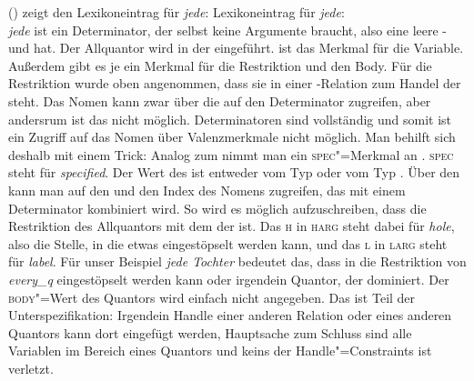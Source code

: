 () zeigt den Lexikoneintrag für \emph{jede}:
\eas
Lexikoneintrag für \emph{jede}:\\
\zs
\emph{jede} ist ein Determinator, der selbst keine Argumente braucht, also eine leere \spr- und
\compsl hat. Der Allquantor wird in der \relsl eingeführt. \argzero ist das Merkmal für die
Variable. Außerdem gibt es je ein Merkmal für die Restriktion und den Body. Für die Restriktion
wurde oben angenommen, dass sie in einer \qeq\vspace{-2pt}\hspace{-.5ex}\hyp Relation zum Handel der \nbar steht. Das Nomen kann
zwar über die \sprl auf den Determinator zugreifen, aber andersrum ist das nicht
möglich. Determinatoren sind vollständig und somit ist ein Zugriff auf das Nomen über Valenzmerkmale
nicht möglich. Man behilft sich deshalb mit einem Trick: Analog zum \modm nimmt man ein
\textsc{spec}"=Merkmal an \citep[--51]{ps2}. \textsc{spec} steht für \emph{specified}. Der Wert des \specms ist
entweder vom Typ  oder vom Typ . Über den \specw kann man auf den \ltopw und
den Index des Nomens zugreifen, das mit einem Determinator kombiniert wird. So wird es möglich
aufzuschreiben, dass die Restriktion des Allquantors \qeq\vspace{-2pt} mit dem \ltopw der \nbar
ist. Das \textsc{h} in \textsc{harg} steht dabei für \emph{hole}, also die Stelle, in die etwas
eingestöpselt werden kann, und das \textsc{l} in \textsc{larg} steht für \emph{label}. Für unser
Beispiel \emph{jede Tochter} bedeutet das, dass  in die Restriktion von
\emph{every\_q} eingestöpselt werden kann oder irgendein Quantor, der 
dominiert. Der \textsc{body}"=Wert des Quantors wird einfach nicht angegeben. Das ist Teil der
Unterspezifikation: Irgendein Handle einer anderen Relation oder eines anderen Quantors kann dort
eingefügt werden, Hauptsache zum Schluss sind alle Variablen im Bereich eines Quantors und keins der
Handle"=Constraints ist verletzt.

